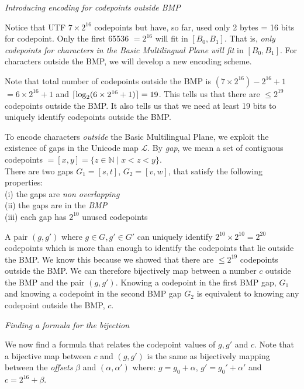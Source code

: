 \frmrule 

\textit{Introducing encoding for codepoints outside BMP}

Notice that UTF $7 \times 2^{16}$ codepoints but have, so far, used only 2 bytes = 16 bits for
codepoint. Only the first 65536 $= 2^{16}$ will fit in $[B_0, B_1]$. 
That is, \textit{only codepoints for characters in the Basic Multilingual 
Plane will fit} in $[B_0, B_1]$. For characters outside the BMP, 
we will develop a new encoding scheme. 


Note that total number of codepoints outside the BMP is $(7 \times 2^{16}) - 2^{16} + 1$ $=6 \times 2^{16} +1$ and
$\lceil\log_2 (6 \times 2^{16} + 1)\rceil = 19$. This tells us that there are $\leqslant 2^{19}$ 
codepoints outside the BMP. It also tells us that we need at least 19 bits to uniquely 
identify codepoints outside the BMP.  

To encode characters \textit{outside} the Basic Multilingual 
Plane, we exploit the existence of gaps in the Unicode map $\mathcal{L}$. By 
\textit{gap}, we mean a set of contiguous codepoints $=[x,y]=\{z\in \mathbb{N} \;|\; x < z < y \}$. \\
There are two gaps $G_1 = [s,t]$, $G_2=[v,w]$, that satisfy the following properties:\\
(i) the gaps are \textit{non overlapping} \\
(ii) the gaps are in the \textit{BMP}\\
(iii) each gap has $2^{10}$ unused codepoints
 
A pair $(g,g')$ where $g \in G, g' \in G'$ can uniquely identify $2^{10} \times 2^{10} = 2^{20}$ codepoints 
which is more than enough 
to identify the codepoints that lie outside the BMP. We know this 
because we showed that there are $\leqslant 2^{19}$ codepoints outside the BMP. 
We can therefore bijectively map between a number $c$ outside the BMP and the pair $(g,g')$.
Knowing a codepoint in the first BMP gap, $G_1$ and knowing a codepoint in the second BMP gap $G_2$ 
is equivalent to knowing any codepoint outside the BMP, $c$. 

\frmrule 

\textit{Finding a formula for the bijection}

We now find a formula that relates the codepoint values of $g,g'$ and $c$. 
Note that a bijective map between $c$ and $(g,g')$ is the same as 
bijectively mapping between the \textit{offsets} $\beta$ and $(\alpha,\alpha')$ 
where: $g = g_0 + \alpha$, $g' = g_0' + \alpha'$ and $c = 2^16 + \beta$.

